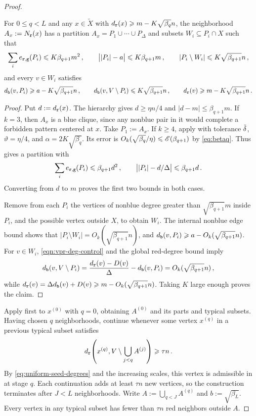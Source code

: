\begin{proof}
\begin{claim}\label{claim:uniform-neighborhood-extraction}
For $0\leq q<L$ and any $x\in\widetilde X$ with $d_{\normalfont\texttt r}(x)\geqslant m-K\sqrt{\beta_q}n$, the neighborhood $A_x:=N_{\normalfont\texttt r}(x)$ has a partition $A_x=P_1\cup\cdots\cup P_\Delta$ and subsets $W_i\subseteq P_i\cap X$ such that
$$\sum_i e_{{\normalfont\texttt r},{\normalfont\texttt g}}(P_i)\leqslant K\beta_{q+1}m^2\,,\qquad \big||P_i|-a\big|\leqslant K\beta_{q+1}m\,,\qquad |P_i\setminus W_i|\leqslant K\sqrt{\beta_{q+1}}n\,,$$
and every $v\in W_i$ satisfies
\begin{equation}\label{eq:uniform-seed-degrees}
d_{\normalfont\texttt b}(v,P_i)\geqslant a-K\sqrt{\beta_{q+1}}n\,,\qquad d_{\normalfont\texttt b}(v,V\setminus P_i)\leqslant K\sqrt{\beta_{q+1}}n\,,\qquad d_{\normalfont\texttt r}(v)\geqslant m-K\sqrt{\beta_{q+1}}n\,.
\end{equation}
\end{claim}
\begin{proof}
Put $d:=d_{\normalfont\texttt r}(x)$. The hierarchy gives $d\geq\eta n/4$ and $|d-m|\leq\beta_{q+1}m$. If $k=3$, then $A_x$ is a blue clique, since any nonblue pair in it would complete a forbidden pattern centered at $x$. Take $P_1:=A_x$. If $k\geq4$, apply  with tolerance $\tilde{\delta}$, $\vartheta=\eta/4$, and $\alpha=2K\sqrt{\beta_q}$. Its error is $O_k(\sqrt{\beta_q}/\eta)\leqslant{\mathscr E}(\beta_{q+1})$ by \eqref{eq:betaq}. Thus  gives a partition with
$$\sum_i e_{{\normalfont\texttt r},{\normalfont\texttt g}}(P_i)\leqslant\beta_{q+1}d^2\,,\qquad \big||P_i|-d/\Delta\big|\leqslant\beta_{q+1}d\,.$$
Converting from $d$ to $m$ proves the first two bounds in both cases.

Remove from each $P_i$ the vertices of nonblue degree greater than $\sqrt{\beta_{q+1}}m$ inside $P_i$, and the possible vertex outside $X$, to obtain $W_i$. The internal nonblue edge bound shows that $|P_i\setminus W_i|=O_k(\sqrt{\beta_{q+1}}n)$, and $d_{\normalfont\texttt b}(v,P_i)\geqslant a-O_k(\sqrt{\beta_{q+1}}n)$. For $v\in W_i$, \eqref{eqn:vpr-deg-control} and the global red-degree bound imply
$$d_{\normalfont\texttt b}(v,V\setminus P_i)=\frac{d_{\normalfont\texttt r}(v)-D(v)}{\Delta}-d_{\normalfont\texttt b}(v,P_i)=O_k(\sqrt{\beta_{q+1}}n)\,,$$
while $d_{\normalfont\texttt r}(v)=\Delta d_{\normalfont\texttt b}(v)+D(v)\geqslant m-O_k(\sqrt{\beta_{q+1}}n)$. Taking $K$ large enough proves the claim.
\end{proof}

Apply  first to $x^{(0)}$ with $q=0$, obtaining $A^{(0)}$ and its parts and typical subsets. Having chosen $q$ neighborhoods, continue whenever some vertex $x^{(q)}$ in a previous typical subset satisfies
$$d_{\normalfont\texttt r}\!\left(x^{(q)},V\setminus\bigcup_{j<q}A^{(j)}\right)\geqslant\tau n\,.$$
By \eqref{eq:uniform-seed-degrees} and the increasing scales, this vertex is admissible in  at stage $q$. Each continuation adds at least $\tau n$ new vertices, so the construction terminates after $J<L$ neighborhoods. Write $A:=\bigcup_{q<J}A^{(q)}$ and $b:=\sqrt{\beta_L}$. Every vertex in any typical subset has fewer than $\tau n$ red neighbors outside $A$.


\end{proof}
